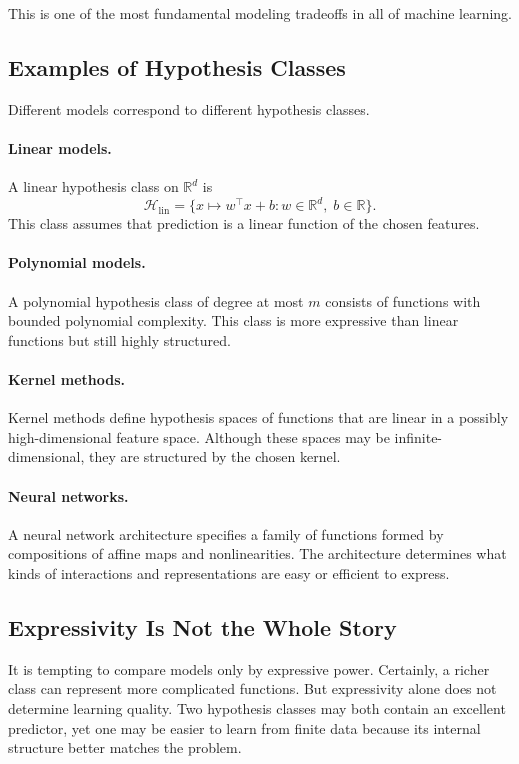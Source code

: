 This is one of the most fundamental modeling tradeoffs in all of machine learning.

\subsection{Examples of Hypothesis Classes}

Different models correspond to different hypothesis classes.

\paragraph{Linear models.}
A linear hypothesis class on $\mathbb{R}^d$ is
\[
\mathcal{H}_{\mathrm{lin}} = \{x \mapsto w^\top x + b : w\in\mathbb{R}^d,\; b\in\mathbb{R}\}.
\]
This class assumes that prediction is a linear function of the chosen features.

\paragraph{Polynomial models.}
A polynomial hypothesis class of degree at most $m$ consists of functions with bounded polynomial complexity. This class is more expressive than linear functions but still highly structured.

\paragraph{Kernel methods.}
Kernel methods define hypothesis spaces of functions that are linear in a possibly high-dimensional feature space. Although these spaces may be infinite-dimensional, they are structured by the chosen kernel.

\paragraph{Neural networks.}
A neural network architecture specifies a family of functions formed by compositions of affine maps and nonlinearities. The architecture determines what kinds of interactions and representations are easy or efficient to express.

\subsection{Expressivity Is Not the Whole Story}

It is tempting to compare models only by expressive power. Certainly, a richer class can represent more complicated functions. But expressivity alone does not determine learning quality. Two hypothesis classes may both contain an excellent predictor, yet one may be easier to learn from finite data because its internal structure better matches the problem.

